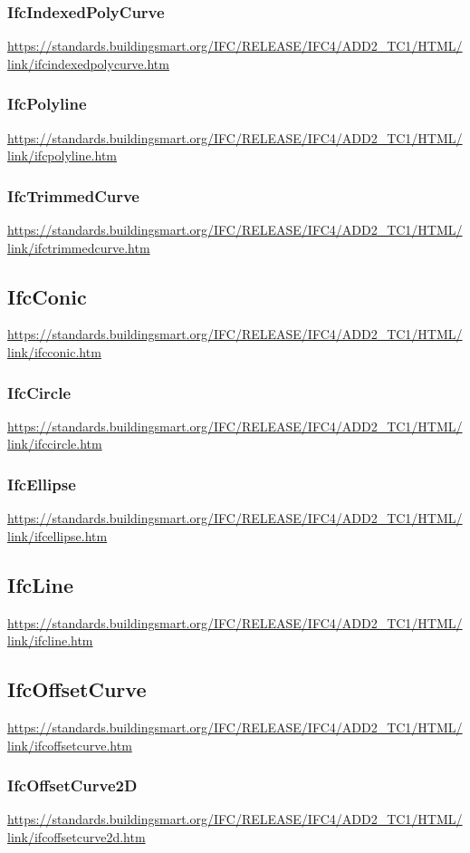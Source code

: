 \documentclass[spanish,12pt,a4paper,final,oneside]{book}
\begin{document}
\subsubsection{IfcIndexedPolyCurve}
\url{https://standards.buildingsmart.org/IFC/RELEASE/IFC4/ADD2_TC1/HTML/link/ifcindexedpolycurve.htm}

\subsubsection{IfcPolyline}
\url{https://standards.buildingsmart.org/IFC/RELEASE/IFC4/ADD2_TC1/HTML/link/ifcpolyline.htm}

\subsubsection{IfcTrimmedCurve}
\url{https://standards.buildingsmart.org/IFC/RELEASE/IFC4/ADD2_TC1/HTML/link/ifctrimmedcurve.htm}


\subsection{IfcConic}
\url{https://standards.buildingsmart.org/IFC/RELEASE/IFC4/ADD2_TC1/HTML/link/ifcconic.htm}

\subsubsection{IfcCircle}
\url{https://standards.buildingsmart.org/IFC/RELEASE/IFC4/ADD2_TC1/HTML/link/ifccircle.htm}

\subsubsection{IfcEllipse}
\url{https://standards.buildingsmart.org/IFC/RELEASE/IFC4/ADD2_TC1/HTML/link/ifcellipse.htm}


\subsection{IfcLine}
\url{https://standards.buildingsmart.org/IFC/RELEASE/IFC4/ADD2_TC1/HTML/link/ifcline.htm}


\subsection{IfcOffsetCurve}
\url{https://standards.buildingsmart.org/IFC/RELEASE/IFC4/ADD2_TC1/HTML/link/ifcoffsetcurve.htm}

\subsubsection{IfcOffsetCurve2D}
\url{https://standards.buildingsmart.org/IFC/RELEASE/IFC4/ADD2_TC1/HTML/link/ifcoffsetcurve2d.htm}
\end{document}
